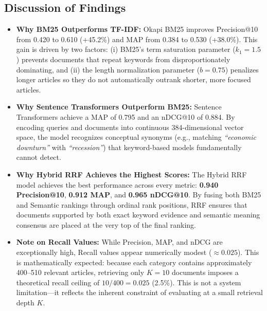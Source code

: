 \documentclass[11pt,a4paper]{article}
\begin{document}
\subsection{Discussion of Findings}
\begin{itemize}[leftmargin=1.5em]
    \item \textbf{Why BM25 Outperforms TF-IDF:} Okapi BM25 improves Precision@10 from 0.420 to 0.610 (+45.2\%) and MAP from 0.384 to 0.530 (+38.0\%). This gain is driven by two factors: (i) BM25's term saturation parameter ($k_1 = 1.5$) prevents documents that repeat keywords from disproportionately dominating, and (ii) the length normalization parameter ($b = 0.75$) penalizes longer articles so they do not automatically outrank shorter, more focused articles.

    \item \textbf{Why Sentence Transformers Outperform BM25:} Sentence Transformers achieve a MAP of 0.795 and an nDCG@10 of 0.884. By encoding queries and documents into continuous 384-dimensional vector space, the model recognizes conceptual synonyms (e.g., matching \textit{``economic downturn''} with \textit{``recession''}) that keyword-based models fundamentally cannot detect.

    \item \textbf{Why Hybrid RRF Achieves the Highest Scores:} The Hybrid RRF model achieves the best performance across every metric: \textbf{0.940 Precision@10}, \textbf{0.912 MAP}, and \textbf{0.965 nDCG@10}. By fusing both BM25 and Semantic rankings through ordinal rank positions, RRF ensures that documents supported by both exact keyword evidence and semantic meaning consensus are placed at the very top of the final ranking.

    \item \textbf{Note on Recall Values:} While Precision, MAP, and nDCG are exceptionally high, Recall values appear numerically modest ($\approx 0.025$). This is mathematically expected: because each category contains approximately 400--510 relevant articles, retrieving only $K=10$ documents imposes a theoretical recall ceiling of $10 / 400 = 0.025$ (2.5\%). This is not a system limitation---it reflects the inherent constraint of evaluating at a small retrieval depth $K$.
\end{itemize}

\newpage

\end{document}
